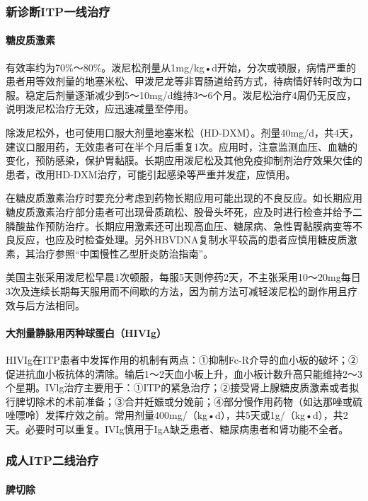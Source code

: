 \subsubsection{新诊断ITP一线治疗}

\paragraph{糖皮质激素}

有效率约为70\%～80\%。泼尼松剂量从1mg/kg•d开始，分次或顿服，病情严重的患者用等效剂量的地塞米松、甲泼尼龙等非胃肠道给药方式，待病情好转时改为口服。稳定后剂量逐渐减少到5～10mg/d维持3～6个月。泼尼松治疗4周仍无反应，说明泼尼松治疗无效，应迅速减量至停用。

除泼尼松外，也可使用口服大剂量地塞米松（HD-DXM）。剂量40mg/d，共4天，建议口服用药，无效患者可在半个月后重复1次。应用时，注意监测血压、血糖的变化，预防感染，保护胃黏膜。长期应用泼尼松及其他免疫抑制剂治疗效果欠佳的患者，改用HD-DXM治疗，可能引起感染等严重并发症，应慎用。

在糖皮质激素治疗时要充分考虑到药物长期应用可能出现的不良反应。如长期应用糖皮质激素治疗部分患者可出现骨质疏松、股骨头坏死，应及时进行检查并给予二膦酸盐作预防治疗。长期应用激素还可出现高血压、糖尿病、急性胃黏膜病变等不良反应，也应及时检查处理。另外HBVDNA复制水平较高的患者应慎用糖皮质激素，其治疗参照“中国慢性乙型肝炎防治指南”。

美国主张采用泼尼松早晨1次顿服，每服5天则停药2天，不主张采用10～20mg每日3次及连续长期每天服用而不间歇的方法，因为前方法可减轻泼尼松的副作用且疗效与后方法相同。

\paragraph{大剂量静脉用丙种球蛋白（HIVIg）}

HIVIg在ITP患者中发挥作用的机制有两点：①抑制Fc-R介导的血小板的破坏；②促进抗血小板抗体的清除。输后1～2天血小板上升，血小板计数升高只能维持2～3个星期。IVlg治疗主要用于：①ITP的紧急治疗；②接受肾上腺糖皮质激素或者拟行脾切除术的术前准备；③合并妊娠或分娩前；④部分慢作用药物（如达那唑或硫唑嘌呤）发挥疗效之前。常用剂量400mg/（kg•d），共5天或1g/（kg•d），共2天。必要时可以重复。IVIg慎用于IgA缺乏患者、糖尿病患者和肾功能不全者。

\subsubsection{成人ITP二线治疗}

\paragraph{脾切除}

